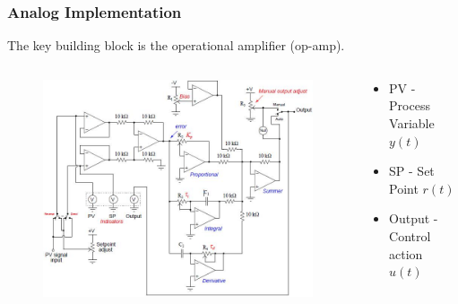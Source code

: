 \begin{frame}
	\frametitle{Analog Implementation}
	The key building block is the operational amplifier (op-amp).
	\begin{columns}
		\begin{column}{0.7 \textwidth}
			\begin{figure}
				\includegraphics[width=1\linewidth]{img/Principles_of_Feedback_Control_Fig_079}
			\end{figure}
		\end{column}
		\begin{column}{0.3 \textwidth}
			\footnotesize{
				\begin{itemize}
					\item PV - Process Variable $y(t)$
					\item SP - Set Point $r(t)$
					\item Output - Control action $u(t)$
				\end{itemize}
			}
		\end{column}
	\end{columns}
\end{frame}

